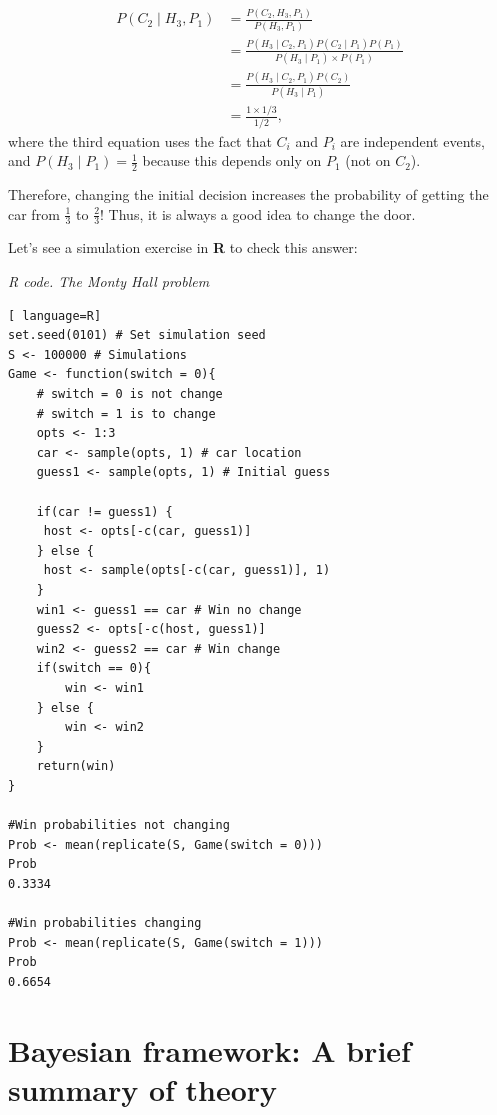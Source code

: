 \begin{align*}
	P(C_2\mid H_3,P_1)&= \frac{P(C_2,H_3,P_1)}{P(H_3,P_1)}\\
	&= \frac{P(H_3\mid C_2,P_1)P(C_2\mid P_1)P(P_1)}{P(H_3\mid P_1)\times P(P_1)}\\
	&= \frac{P(H_3\mid C_2,P_1)P(C_2)}{P(H_3\mid P_1)}\\
	&=\frac{1\times 1/3}{1/2},
\end{align*}
where the third equation uses the fact that \( C_i \) and \( P_i \) are independent events, and \( P(H_3 \mid P_1) = \frac{1}{2} \) because this depends only on \( P_1 \) (not on \( C_2 \)).

Therefore, changing the initial decision increases the probability of getting the car from \( \frac{1}{3} \) to \( \frac{2}{3} \)! Thus, it is always a good idea to change the door.

Let's see a simulation exercise in \textbf{R} to check this answer:


\begin{tcolorbox}[enhanced,width=4.67in,center upper,
	fontupper=\large\bfseries,drop shadow southwest,sharp corners]
\textit{R code. The Monty Hall problem}
\begin{VF}
\begin{lstlisting}[ language=R]
set.seed(0101) # Set simulation seed
S <- 100000 # Simulations
Game <- function(switch = 0){
	# switch = 0 is not change  
	# switch = 1 is to change
	opts <- 1:3 
	car <- sample(opts, 1) # car location
	guess1 <- sample(opts, 1) # Initial guess 
	
	if(car != guess1) {
	 host <- opts[-c(car, guess1)]
	} else {
	 host <- sample(opts[-c(car, guess1)], 1)
	}	
	win1 <- guess1 == car # Win no change
	guess2 <- opts[-c(host, guess1)]	
	win2 <- guess2 == car # Win change
	if(switch == 0){
		win <- win1
	} else {
		win <- win2
	}
	return(win)
}

#Win probabilities not changing
Prob <- mean(replicate(S, Game(switch = 0))) 
Prob
0.3334

#Win probabilities changing
Prob <- mean(replicate(S, Game(switch = 1))) 
Prob
0.6654
\end{lstlisting}
\end{VF}
\end{tcolorbox}

\section{Bayesian framework: A brief summary of theory}\label{sec12}

